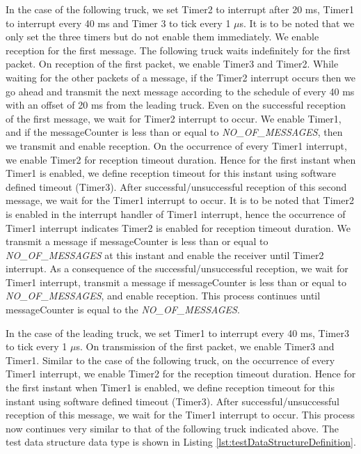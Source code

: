 In the case of the following truck, we set Timer2 to interrupt after 20 ms, Timer1 to interrupt every 40 ms and Timer 3 to tick every 1 $\mu$s. It is to be noted that we only set the three timers but do not enable them immediately. We enable reception for the first message. The following truck waits indefinitely for the first packet. On reception of the first packet, we enable Timer3 and Timer2. While waiting for the other packets of a message, if the Timer2 interrupt occurs then we go ahead and transmit the next message according to the schedule of every 40 ms with an offset of 20 ms from the leading truck. Even on the successful reception of the first message, we wait for Timer2 interrupt to occur. We enable Timer1, and if the messageCounter is less than or equal to \emph{NO\_OF\_MESSAGES}, then we transmit and enable reception. On the occurrence of every Timer1 interrupt, we enable Timer2 for reception timeout duration. Hence for the first instant when Timer1 is enabled, we define reception timeout for this instant using software defined timeout (Timer3). After successful/unsuccessful reception of this second message, we wait for the Timer1 interrupt to occur. It is to be noted that Timer2 is enabled in the interrupt handler of Timer1 interrupt, hence the occurrence of Timer1 interrupt indicates Timer2 is enabled for reception timeout duration. We transmit a message if messageCounter is less than or equal to \emph{NO\_OF\_MESSAGES} at this instant and enable the receiver until Timer2 interrupt. As a consequence of the successful/unsuccessful reception, we wait for Timer1 interrupt, transmit a message if messageCounter is less than or equal to \emph{NO\_OF\_MESSAGES}, and enable reception. This process continues until messageCounter is equal to the \emph{NO\_OF\_MESSAGES}.

In the case of the leading truck, we set Timer1 to interrupt every 40 ms, Timer3 to tick every 1 $\mu$s. On transmission of the first packet, we enable Timer3 and Timer1. Similar to the case of the following truck, on the occurrence of every Timer1 interrupt, we enable Timer2 for the reception timeout duration. Hence for the first instant when Timer1 is enabled, we define reception timeout for this instant using software defined timeout (Timer3). After successful/unsuccessful reception of this message, we wait for the Timer1 interrupt to occur. This process now continues very similar to that of the following truck indicated above. The test data structure data type is shown in Listing \ref{lst:testDataStructureDefinition}.

